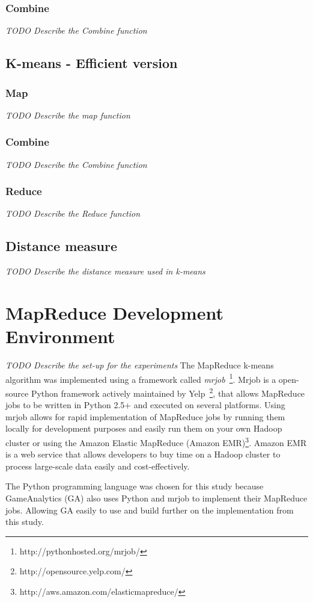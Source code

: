\subsubsection{Combine}
\textit{TODO Describe the Combine function}

\lipsum[5-6]

\subsection{K-means - Efficient version}
\lipsum[1]

\subsubsection{Map}
\textit{TODO Describe the map function}

\lipsum[1-2]

\subsubsection{Combine}
\textit{TODO Describe the Combine function}

\lipsum[5-6]


\subsubsection{Reduce}
\textit{TODO Describe the Reduce function}

\lipsum[7-8]


\subsection{Distance measure}
\textit{TODO Describe the distance measure used in k-means}

\lipsum[1]


\section{MapReduce Development Environment}
\textit{TODO Describe the set-up for the experiments}
The MapReduce k-means algorithm was implemented using a framework called \textit{mrjob}~\footnote{http://pythonhosted.org/mrjob/}. Mrjob is a open-source Python framework actively maintained by Yelp~\footnote{http://opensource.yelp.com/}, that allows MapReduce jobs to be written in Python 2.5+ and executed on several platforms. Using mrjob allows for rapid implementation of MapReduce jobs by running them locally for development purposes and easily run them on your own Hadoop cluster or using the Amazon Elastic MapReduce (Amazon EMR)\footnote{http://aws.amazon.com/elasticmapreduce/}. Amazon EMR is a web service that allows developers to buy time on a Hadoop cluster to process large-scale data easily and cost-effectively.

The Python programming language was chosen for this study because GameAnalytics (GA) also uses Python and mrjob to implement their MapReduce jobs. Allowing GA easily to use and build further on the implementation from this study. 
\lipsum[1-3]